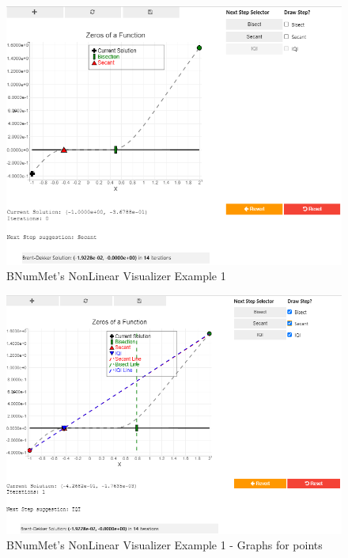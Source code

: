\begin{figure}[H]
    \centering
    \includegraphics[width=\textwidth]{Include/Images/Thesis/Development/Visualizers/NON LINEAR VISUALIZER/BNumMet.NonLinear.Ex1.png}
    \caption{BNumMet's NonLinear Visualizer Example 1 }
    \label{fig:BNumMet's NonLinear Visualizer Example}
\end{figure}
\begin{figure}[H]
    \centering
    \includegraphics[width=\textwidth]{Include/Images/Thesis/Development/Visualizers/NON LINEAR VISUALIZER/BNumMet.NonLinear.Ex1.1.png}
    \caption{BNumMet's NonLinear Visualizer Example 1 - Graphs for points }
    \label{fig:BNumMet's NonLinear Visualizer Example - Graphs for points }
\end{figure}

